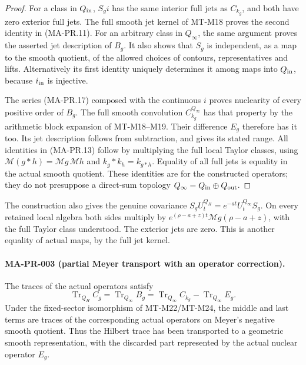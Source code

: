 \begin{proof}
For a class in $Q_{\rm in}$, $S_g i$ has the same
interior full jets as $C_{k_g}$, and both have zero
exterior full jets.  The full smooth jet kernel of
MT-M18 proves the second identity in (MA-PR.11).
For an arbitrary class in $Q_\infty$, the same argument
proves the asserted jet description of $B_g$.
It also shows that $S_g$ is independent, as a map to
the smooth quotient, of the allowed choices of
contours, representatives and lifts.
Alternatively its first identity uniquely determines
it among maps into $Q_{\rm in}$, because $i_{\rm in}$
is injective.

The series (MA-PR.17) composed with the continuous $i$
proves nuclearity of every positive order of $B_g$.
The full smooth convolution $C_{k_g}^{Q_\infty}$
has that property by the arithmetic block expansion
of MT-M18--M19.  Their difference $E_g$ therefore
has it too.  Its jet description follows from
subtraction, and gives its stated range.
All identities in (MA-PR.13) follow by multiplying
the full local Taylor classes, using
$\mathcal M(g*h)=\mathcal Mg\,\mathcal Mh$ and
$k_g*k_h=k_{g*h}$.  Equality of all full jets is
equality in the actual smooth quotient.
These identities are for the constructed operators;
they do not presuppose a direct-sum topology
$Q_\infty=Q_{\rm in}\oplus Q_{\rm out}$.
\end{proof}

The construction also gives the genuine covariance
$S_gU_t^{Q_H}=e^{-at}U_t^{Q_\infty}S_g$.
On every retained local algebra both sides multiply
by $e^{(\rho-a+z)t}\mathcal Mg(\rho-a+z)$, with the
full Taylor class understood.  The exterior jets
are zero.  This is another equality of actual maps,
by the full jet kernel.

\paragraph{MA-PR-003 (partial Meyer transport with an operator correction).}
The traces of the actual operators satisfy
\[
 \operatorname{Tr}_{Q_H}C_g
    =\operatorname{Tr}_{Q_\infty}B_g
    =\operatorname{Tr}_{Q_\infty}C_{k_g}
                         -\operatorname{Tr}_{Q_\infty}E_g .
\tag{MA-PR.19}
\]
Under the fixed-sector isomorphism of MT-M22/MT-M24,
the middle and last terms are traces of the corresponding
actual operators on Meyer's negative smooth quotient.
Thus the Hilbert trace has been transported to a
geometric smooth representation, with the discarded
part represented by the actual nuclear operator $E_g$.

